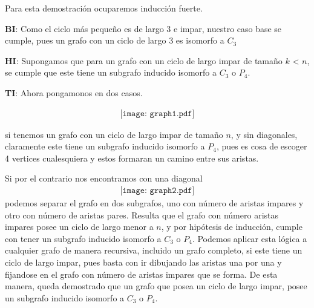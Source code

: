 Para esta demostración ocuparemos inducción fuerte. 

\textbf{BI}: Como el ciclo más pequeño es de largo 3 e impar, nuestro caso base se cumple, pues un grafo con un ciclo de largo 3 es isomorfo a $C_3$

\textbf{HI}: Supongamos que para un grafo con un ciclo de largo impar de tamaño $k$ < $n$, se cumple que este tiene un subgrafo inducido isomorfo a $C_3$ o $P_4$.

\textbf{TI}: Ahora pongamonos en dos casos. 

\begin{align*}
    \texttt{[image: graph1.pdf]}
\end{align*}

si tenemos un grafo con un ciclo de largo impar de tamaño $n$, y sin diagonales, claramente este tiene un subgrafo inducido isomorfo a $P_4$, pues es cosa de escoger 4 vertices cualesquiera y estos formaran un camino entre sus aristas. 

Si por el contrario nos encontramos con una diagonal 
\begin{align*}
    \texttt{[image: graph2.pdf]}
\end{align*}
podemos separar el grafo en dos subgrafos, uno con número de aristas impares y otro con número de aristas pares. Resulta que el grafo con número aristas impares posee un ciclo de largo menor a $n$, y por hipótesis de inducción, cumple con tener un subgrafo inducido isomorfo a $C_3$ o $P_4$. Podemos aplicar esta lógica a cualquier grafo de manera recursiva, incluido un grafo completo, si este tiene un ciclo de largo impar, pues basta con ir dibujando las aristas una por una y fijandose en el grafo con número de aristas impares que se forma. De esta manera, queda demostrado que un grafo que posea un ciclo de largo impar, posee un subgrafo inducido isomorfo a $C_3$ o $P_4$.